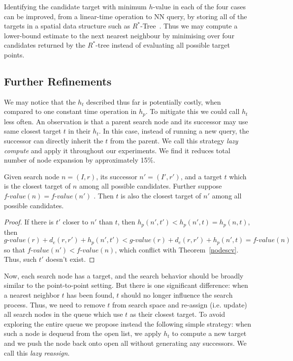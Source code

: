 \noindent
Identifying the candidate target with minimum $h$-value in each of the four cases can be improved,
from a linear-time operation to NN query, by storing all of the
targets in a spatial data structure such as $R^*$-Tree~\cite{beckmann1990r}.
Thus we may compute a lower-bound estimate to the next nearest neighbour by minimising over
four candidates returned by the $R^*$-tree instead of evaluating all possible target points.

\subsection{Further Refinements}
We may notice that the $h_t$ described thus far is potentially costly,
when compared to one constant time operation in $h_p$.
To mitigate this we could call $h_t$ less often. 
An observation is that a parent search node and its successor may use same closest target $t$
in their $h_t$. In this case, instead of running a new query, the successor can directly
inherit the $t$ from the parent.  We call this strategy \textit{lazy compute} and apply it throughout our experiments.
We find it reduces total number of node expansion by approximately 15\%.

\begin{corollary}\label{lazy-compute}
  Given search node $n=(I,r)$, its successor $n'=(I', r')$,
  and a target $t$ which is the closest target of $n$ among all possible candidates.
  Further suppose $\textit{f-value}(n)=\textit{f-value}(n')$ .
  Then $t$ is also the closest target of $n'$ among all possible candidates.
\end{corollary}

\begin{proof}
  If there is $t'$ closer to $n'$ than $t$, then $h_p(n', t') <
  h_p(n', t) = h_p(n, t)$, then 
  $$
  \textit{g-value}(r) + d_e(r, r') + h_p(n', t') < \textit{g-value}(r) + d_e(r, r') + h_p(n',
  t) = \textit{f-value}(n)
  $$
  so that $\textit{f-value}(n') < \textit{f-value}(n)$, which conflict with
  Theorem~\ref{nodescv}. Thus, such $t'$ doesn't exist.
\end{proof}

Now, each search node has a target, and the search behavior should be broadly similar to 
the point-to-point setting.  But there is one significant difference:
when a nearest neighbor $t$ has been found, $t$ should no longer influence the search process.
Thus, we need to remove $t$ from search space and re-assign (i.e. update)
all search nodes in the queue which use $t$ as their closest target. 
To avoid exploring the entire queue we propose instead the following simple strategy: 
when such a node is dequeud from the open list, we apply $h_t$ to compute a new target
and we push the node back onto open all without generating any successors. 
We call this \textit{lazy reassign}.

